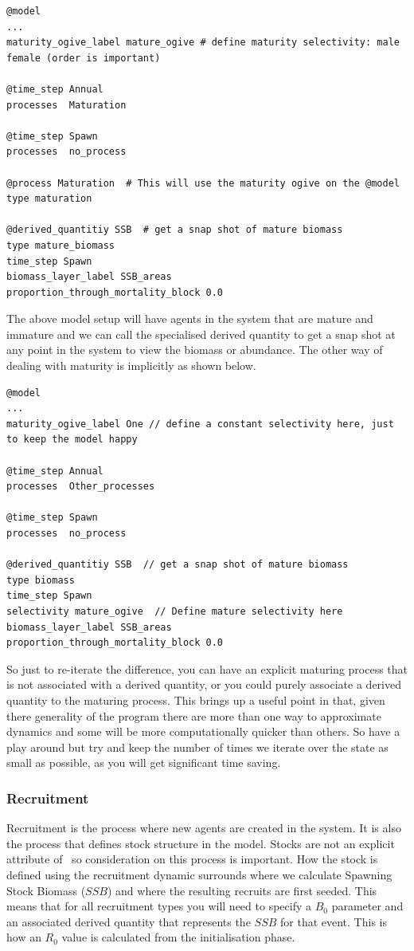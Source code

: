 {\small{\begin{verbatim}
@model
...
maturity_ogive_label mature_ogive # define maturity selectivity: male female (order is important)

@time_step Annual
processes  Maturation 

@time_step Spawn
processes  no_process 

@process Maturation  # This will use the maturity ogive on the @model
type maturation

@derived_quantitiy SSB  # get a snap shot of mature biomass
type mature_biomass
time_step Spawn
biomass_layer_label SSB_areas
proportion_through_mortality_block 0.0
\end{verbatim}}}

The above model setup will have agents in the system that are mature and immature and we can call the specialised  derived quantity to get a snap shot at any point in the system to view the biomass or abundance. The other way of dealing with maturity is implicitly as shown below.

{\small{\begin{verbatim}
@model
...
maturity_ogive_label One // define a constant selectivity here, just to keep the model happy

@time_step Annual
processes  Other_processes

@time_step Spawn
processes  no_process 	
	
@derived_quantitiy SSB  // get a snap shot of mature biomass
type biomass
time_step Spawn
selectivity mature_ogive  // Define mature selectivity here
biomass_layer_label SSB_areas
proportion_through_mortality_block 0.0
\end{verbatim}}}

So just to re-iterate the difference, you can have an explicit maturing process that is not associated with a derived quantity, or you could purely associate a derived quantity to the maturing process. This brings up a useful point in that, given there generality of the program there are more than one way to approximate dynamics and some will be more computationally quicker than others. So have a play around but try and keep the number of times we iterate over the state as small as possible, as you will get significant time saving.


\subsubsection{Recruitment}
Recruitment is the process where new agents are created in the system. It is also the process that defines stock structure in the model. Stocks are not an explicit attribute of \IBM\ so consideration on this process is important. How the stock is defined using the recruitment dynamic surrounds where we calculate Spawning Stock Biomass ($SSB$) and where the resulting recruits are first seeded. This means that for all recruitment types you will need to specify a $B_0$ parameter and an associated derived quantity that represents the $SSB$ for that event. This is how an $R_0$ value is calculated from the initialisation phase.

